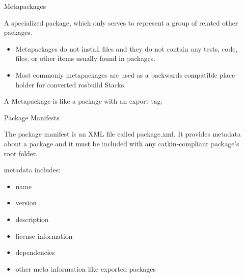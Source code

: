 \documentclass{beamer}
\begin{document}
\begin{frame}{Metapackages}	
	
	\begin{definition}[Metapackages]
		A specialized package, which only serves to represent a group of related other packages. 
	\end{definition}
	
	\begin{itemize}
		\item Metapackages do not install files and they do not contain any tests, code, files, or other items usually found in packages. \\
		\item Most commonly metapackages are used as a backwards compatible place holder for converted rosbuild Stacks. 
	\end{itemize}
	
	A Metapackage is like a package with an export tag:
	
	

\end{frame}


\begin{frame}{Package Manifests}	
	\begin{definition}
		The package manifest is an XML file called package.xml. It provides metadata about a package and it must be included with any catkin-compliant package's root folder. 
	\end{definition}
	
	metadata includes: 
	\begin{itemize}
		\item name
		\item version
		\item description
		\item license information
		\item dependencies
		\item other meta information like exported packages
	\end{itemize}
	
\end{frame}

\end{document}
